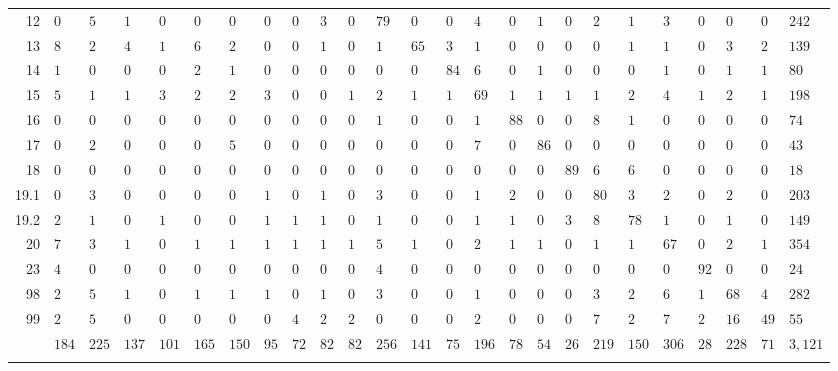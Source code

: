 \begin{table}[!htbp]
\begin{tabularx}{\textwidth}{r|XXXXXXXXXXXXXXXXXXXXXXXX}
12 & $0$ & $5$ & $1$ & $0$ & $0$ & $0$ & $0$ & $0$ & $3$ & $0$ & $79$ & $0$ & $0$ & $4$ & $0$ & $1$ & $0$ & $2$ & $1$ & $3$ & $0$ & $0$ & $0$ & $242$ \\ 
13 & $8$ & $2$ & $4$ & $1$ & $6$ & $2$ & $0$ & $0$ & $1$ & $0$ & $1$ & $65$ & $3$ & $1$ & $0$ & $0$ & $0$ & $0$ & $1$ & $1$ & $0$ & $3$ & $2$ & $139$ \\ 
14 & $1$ & $0$ & $0$ & $0$ & $2$ & $1$ & $0$ & $0$ & $0$ & $0$ & $0$ & $0$ & $84$ & $6$ & $0$ & $1$ & $0$ & $0$ & $0$ & $1$ & $0$ & $1$ & $1$ & $80$ \\ 
15 & $5$ & $1$ & $1$ & $3$ & $2$ & $2$ & $3$ & $0$ & $0$ & $1$ & $2$ & $1$ & $1$ & $69$ & $1$ & $1$ & $1$ & $1$ & $2$ & $4$ & $1$ & $2$ & $1$ & $198$ \\ 
16 & $0$ & $0$ & $0$ & $0$ & $0$ & $0$ & $0$ & $0$ & $0$ & $0$ & $1$ & $0$ & $0$ & $1$ & $88$ & $0$ & $0$ & $8$ & $1$ & $0$ & $0$ & $0$ & $0$ & $74$ \\ 
17 & $0$ & $2$ & $0$ & $0$ & $0$ & $5$ & $0$ & $0$ & $0$ & $0$ & $0$ & $0$ & $0$ & $7$ & $0$ & $86$ & $0$ & $0$ & $0$ & $0$ & $0$ & $0$ & $0$ & $43$ \\ 
18 & $0$ & $0$ & $0$ & $0$ & $0$ & $0$ & $0$ & $0$ & $0$ & $0$ & $0$ & $0$ & $0$ & $0$ & $0$ & $0$ & $89$ & $6$ & $6$ & $0$ & $0$ & $0$ & $0$ & $18$ \\ 
19.1 & $0$ & $3$ & $0$ & $0$ & $0$ & $0$ & $1$ & $0$ & $1$ & $0$ & $3$ & $0$ & $0$ & $1$ & $2$ & $0$ & $0$ & $80$ & $3$ & $2$ & $0$ & $2$ & $0$ & $203$ \\ 
19.2 & $2$ & $1$ & $0$ & $1$ & $0$ & $0$ & $1$ & $1$ & $1$ & $0$ & $1$ & $0$ & $0$ & $1$ & $1$ & $0$ & $3$ & $8$ & $78$ & $1$ & $0$ & $1$ & $0$ & $149$ \\ 
20 & $7$ & $3$ & $1$ & $0$ & $1$ & $1$ & $1$ & $1$ & $1$ & $1$ & $5$ & $1$ & $0$ & $2$ & $1$ & $1$ & $0$ & $1$ & $1$ & $67$ & $0$ & $2$ & $1$ & $354$ \\ 
23 & $4$ & $0$ & $0$ & $0$ & $0$ & $0$ & $0$ & $0$ & $0$ & $0$ & $4$ & $0$ & $0$ & $0$ & $0$ & $0$ & $0$ & $0$ & $0$ & $0$ & $92$ & $0$ & $0$ & $24$ \\ 
98 & $2$ & $5$ & $1$ & $0$ & $1$ & $1$ & $1$ & $0$ & $1$ & $0$ & $3$ & $0$ & $0$ & $1$ & $0$ & $0$ & $0$ & $3$ & $2$ & $6$ & $1$ & $68$ & $4$ & $282$ \\ 
99 & $2$ & $5$ & $0$ & $0$ & $0$ & $0$ & $0$ & $4$ & $2$ & $2$ & $0$ & $0$ & $0$ & $2$ & $0$ & $0$ & $0$ & $7$ & $2$ & $7$ & $2$ & $16$ & $49$ & $55$ \\ 
 & $184$ & $225$ & $137$ & $101$ & $165$ & $150$ & $95$ & $72$ & $82$ & $82$ & $256$ & $141$ & $75$ & $196$ & $78$ & $54$ & $26$ & $219$ & $150$ & $306$ & $28$ & $228$ & $71$ & $3,121$ \\ 
\hline \\[-1.8ex] 
\end{tabularx} 
\end{table} 

